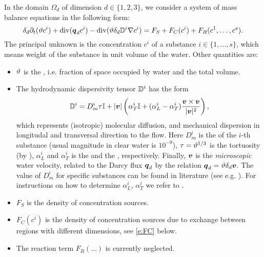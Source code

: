 In the domain $\Omega_d$ of dimension $d\in\{1,2,3\}$, we consider a system of mass balance equations in the following form:
\begin{equation}
    \label{e:ADE}
   \delta_d\partial_t ( \th c^i) + \div ( \vc q_d c^i ) - \div (\th \delta_d \D^i \grad c^i ) = F_S + F_C(c^i) + F_R(c^1,\dots, c^s).
\end{equation}
The principal unknown is the concentration $c^i$  of a substance $i\in\{1,\dots, s\}$, which means weight of the substance in unit volume of the water.
Other quantities are:
\begin{itemize}

\item $\vartheta$ \units{}{}{} is the , i.e. fraction of space occupied by water and the total volume.
\item The hydrodynamic dispersivity tensor ${{\mathbb{D}}}^i$  has the form
\[
  {{\mathbb{D}}}^i =D_m^i \tau {\mathbb{I}} + \lvert\mathbf{\boldsymbol{v}}\rvert\left(\alpha_T^i {\mathbb{I}} + (\alpha_L^i - \alpha_T^i) \frac{\mathbf{\boldsymbol{v}} \times \mathbf{\boldsymbol{v}}}{\lvert\mathbf{\boldsymbol{v}}\rvert^2}\right),
\]
which represents (isotropic) molecular diffusion, and mechanical dispersion in longitudal and transversal direction to the flow.
Here $D_m^i$  is the  of the $i$-th substance (usual magnitude in clear water is $10^{-9}$), $\tau=\vartheta^{1/3}$ is the tortuosity (by \cite{millington_quirk}), $\alpha_L^i$  and $\alpha_T^i$  is the  and the , respectively.
Finally, $\mathbf{\boldsymbol{v}}$  is the \emph{microscopic} water velocity, related to the Darcy flux $\mathbf{\boldsymbol{q}}_d$ by the relation $\mathbf{\boldsymbol{q}}_d = \vartheta\delta_d\mathbf{\boldsymbol{v}}$.
The value of $D_m^i$ for specific substances can be found in literature (see e.g. \cite{cislerova_vogel}).
For instructions on how to determine $\alpha_L^i$, $\alpha_T^i$ we refer to \cite{marsily,domenico_schwartz}.

\item $F_S$  is the density of concentration sources.

\item $F_C(c^i)$  is the density of concentration sources due to exchange between regions with different dimensions, see \eqref{e:FC} below.

\item The reaction term $F_R(\dots)$  is currently neglected.
\end{itemize}



